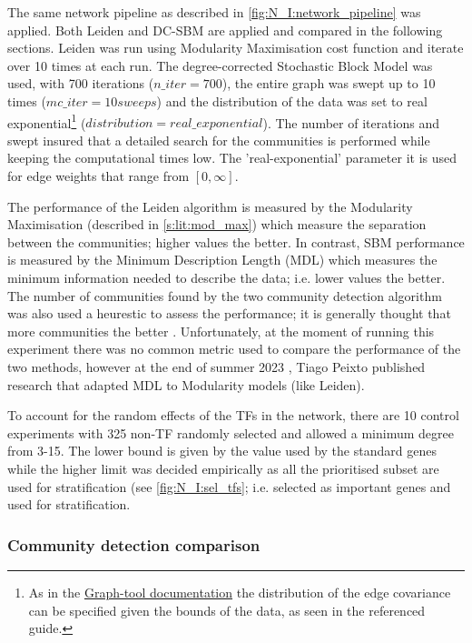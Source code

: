 The same network pipeline as described in \cref{fig:N_I:network_pipeline} was applied. Both Leiden and DC-SBM are applied and compared in the following sections. Leiden was run using Modularity Maximisation cost function and iterate over 10 times at each run. The degree-corrected Stochastic Block Model was used, with 700 iterations ($n\_iter=700$), the entire graph was swept up to 10 times ($mc\_iter = 10 sweeps$) and the distribution of the data was set to real exponential\footnote{As in the \href{https://graph-tool.skewed.de/static/doc/demos/inference/inference.html}{Graph-tool documentation} the distribution of the edge covariance can be specified given the bounds of the data, as seen in the referenced guide.} ($distribution = real\_exponential$). The number of iterations and swept insured that a detailed search for the communities is performed while keeping the computational times low. The 'real-exponential' parameter it is used for edge weights that range from $[0, \infty]$.

The performance of the Leiden algorithm is measured by the Modularity Maximisation (described in \cref{s:lit:mod_max}) which measure the separation between the communities; higher values the better. In contrast, SBM performance is measured by the Minimum Description Length (MDL) which measures the minimum information needed to describe the data; i.e. lower values the better. The number of communities found by the two community detection algorithm was also used a heurestic to assess the performance; it is generally thought that more communities the better \citet{Care2019-ij}. Unfortunately, at the moment of running this experiment there was no common metric used to compare the performance of the two methods, however at the end of summer 2023 \citet{Peixoto2023-mw}, Tiago Peixto published research that adapted MDL to Modularity models (like Leiden).

To account for the random effects of the TFs in the network, there are 10 control experiments with 325 non-TF randomly selected and allowed a minimum degree from 3-15. The lower bound is given by the value used by the standard genes while the higher limit was decided empirically as all the prioritised subset are used for stratification (see \cref{fig:N_I:sel_tfs}; i.e. selected as important genes and used for stratification.



\subsubsection{Community detection comparison}

